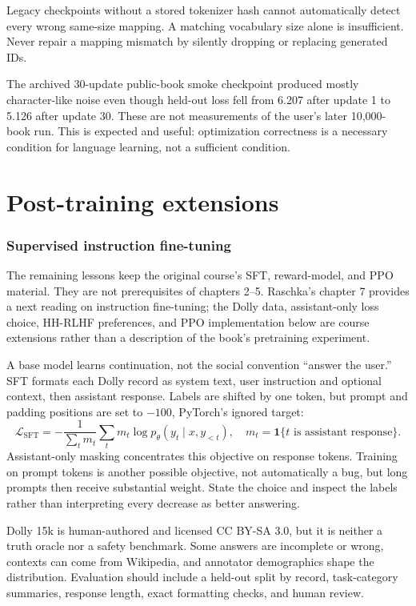 \documentclass[11pt]{article}
\begin{document}
Legacy checkpoints without a stored tokenizer hash cannot automatically detect
every wrong same-size mapping. A matching vocabulary size alone is insufficient.
Never repair a mapping mismatch by silently dropping or replacing generated IDs.

The archived 30-update public-book smoke checkpoint produced mostly
character-like noise even though held-out loss fell from 6.207 after update 1
to 5.126 after update 30. These are not measurements of the user's later
10,000-book run. This is expected and useful:
optimization correctness is a necessary condition for language learning, not a
sufficient condition.

\clearpage
\part{Post-training extensions}
\section{Supervised instruction fine-tuning}

The remaining lessons keep the original course's SFT, reward-model, and PPO
material. They are not prerequisites of chapters 2--5. Raschka's chapter 7
provides a next reading on instruction fine-tuning; the Dolly data, assistant-only
loss choice, HH-RLHF preferences, and PPO implementation below are course
extensions rather than a description of the book's pretraining experiment.

A base model learns continuation, not the social convention ``answer the user.''
SFT formats each Dolly record as system text, user instruction and optional
context, then assistant response. Labels are shifted by one token, but prompt and
padding positions are set to $-100$, PyTorch's ignored target:
\[
\mathcal L_{\mathrm{SFT}}
=-\frac{1}{\sum_t m_t}\sum_t m_t
\log p_\theta(y_t\mid x,y_{<t}),
\quad m_t=\mathbf{1}\{t\text{ is assistant response}\}.
\]
Assistant-only masking concentrates this objective on response tokens.
Training on prompt tokens is another possible objective, not automatically a
bug, but long prompts then receive substantial weight. State the choice and
inspect the labels rather than interpreting every decrease as better answering.

Dolly 15k is human-authored and licensed CC BY-SA 3.0, but it is neither a truth
oracle nor a safety benchmark. Some answers are incomplete or wrong, contexts
can come from Wikipedia, and annotator demographics shape the distribution.
Evaluation should include a held-out split by record, task-category summaries,
response length, exact formatting checks, and human review.
\end{document}
